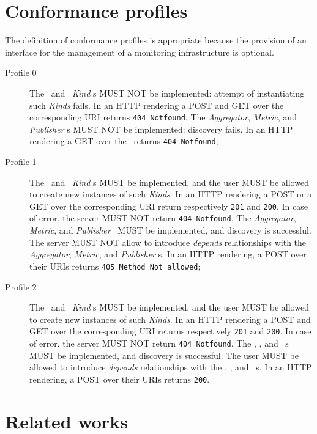 \documentclass[10pt]{article}  %
\begin{document}
\section{Conformance profiles}

The definition of conformance profiles is appropriate because the provision of an interface for the management of a monitoring infrastructure is optional. 

\begin{description}

\item[Profile 0] The \coll\ and \sens\ {\em Kind} s MUST NOT be implemented: attempt of instantiating such {\em Kinds} fails.  In an HTTP rendering a POST and GET over the corresponding URI returns {\tt 404 Notfound}. The {\em Aggregator}, {\em Metric}, and {\em Publisher} \mi s MUST NOT be implemented: discovery fails. In an HTTP rendering a GET over the \mi\ returns {\tt 404 Notfound}; 

\item[Profile 1] The \coll\ and \sens\ {\em Kind} s MUST be implemented, and the user MUST be allowed to create new instances of such {\em Kinds}.  In an HTTP rendering a POST or a GET over the corresponding URI return respectively {\tt 201} and {\tt 200}. In case of error, the server MUST NOT return {\tt 404 Notfound}. The {\em Aggregator}, {\em Metric}, and {\em Publisher} \mi\ MUST be implemented, and discovery is successful. The server MUST NOT allow to introduce {\em depends} relationships with the {\em Aggregator}, {\em Metric}, and {\em Publisher} \mi s. In an HTTP rendering, a POST over their URIs returns {\tt 405 Method Not allowed}; 

\item[Profile 2]  The \coll\ and \sens\ {\em Kind} s MUST be implemented, and the user MUST be allowed to create new instances of such {\em Kinds}.  In an HTTP rendering a POST and GET over the corresponding URI returns respectively {\tt 201} and {\tt 200}. In case of error, the server MUST NOT return {\tt 404 Notfound}. The \aggr , \metr , and \publ\ \mi s MUST be implemented, and discovery is successful. The user MUST be allowed to introduce {\em depends} relationships with the  \aggr , \metr , and \publ\ \mi s. In an HTTP rendering, a POST over their URIs returns {\tt 200}.

\end{description}

\section{Related works}
\end{document}
